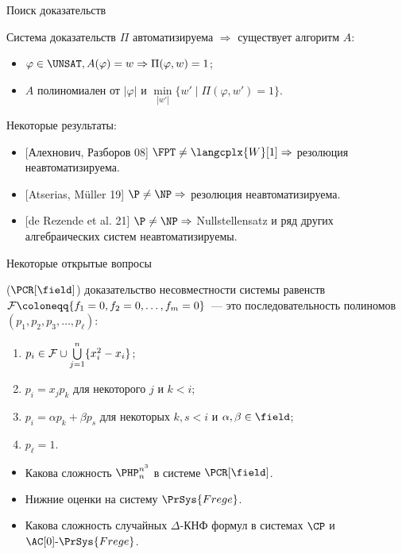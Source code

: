 \begin{frame}{Поиск доказательств}

    Система доказательств $\Pi$ автоматизируема $\Rightarrow$ существует алгоритм $A$:
    \begin{itemize}
        \item $\varphi \in \UNSAT, A(\varphi) = w \Rightarrow \Pi(\varphi, w) = 1$;
        \item $A$ полиномиален от $|\varphi|$ и $\min\limits_{|w'|} \{w' \mid \Pi(\varphi, w') = 1\}$.
    \end{itemize}

    \pause
    Некоторые результаты:
    \begin{itemize}
        \item{} [Алехнович, Разборов 08] $\FPT \neq \langcplx{W}[1] \Rightarrow$ резолюция
            неавтоматизируема.
            \pause
        \item{} [Atserias, M{\"{u}}ller 19] $\P \neq \NP \Rightarrow$ резолюция неавтоматизируема.
            \pause
        \item{} [de Rezende et al. 21] $\P \neq \NP \Rightarrow$ Nullstellensatz и ряд других
            алгебраических систем неавтоматизируемы.
    \end{itemize}
\end{frame}

\begin{frame}{Некоторые открытые вопросы}

     ($\PCR[\field]$) доказательство несовместности системы равенств $\Fs
    \coloneqq \{f_1 = 0, f_2 = 0, \dots, f_m = 0\}$~--- это последовательность полиномов $(p_1, p_2, p_3,
    \dots, p_{\ell})$:
    \pause
    \begin{enumerate}
        \item $p_i \in \mathcal{F} \cup \bigcup\limits_{j = 1}^{n} \{x_i^2 - x_i\}$;
        \pause
        \item $p_i = x_j p_k$ для некоторого $j$ и $k < i$;
        \pause    
        \item $p_i = \alpha p_k + \beta p_s$ для некоторых $k, s < i$ и $\alpha, \beta \in \field$;
        \pause
        \item $p_{\ell} = 1$.
    \end{enumerate}
    



    \begin{itemize}
        \item Какова сложность $\PHP_n^{n^3}$ в системе $\PCR[\field]$.
            \pause
        \item Нижние оценки на систему $\PrSys{Frege}$.
        \item Какова сложность случайных $\Delta$-КНФ формул в системах $\CP$ и
            $\AC[0]\text{-}\PrSys{Frege}$.
    \end{itemize}

\end{frame}


